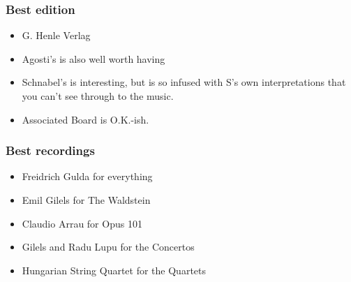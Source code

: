 \documentclass{article}
\begin{document}
\subsubsection{Best edition}

\begin{itemize}
    \item G. Henle Verlag
    \item Agosti's is also well worth having
    \item Schnabel's is interesting, but is so infused with S's own interpretations that you can't see through to the music.
    \item Associated Board is O.K.-ish.
\end{itemize}

\subsubsection{Best recordings}

\begin{itemize}
    \item Freidrich Gulda for everything
    \item Emil Gilels for The Waldstein
    \item Claudio Arrau for Opus 101
    \item Gilels and Radu Lupu for the Concertos
    \item Hungarian String Quartet for the Quartets
\end{itemize}
\end{document}
